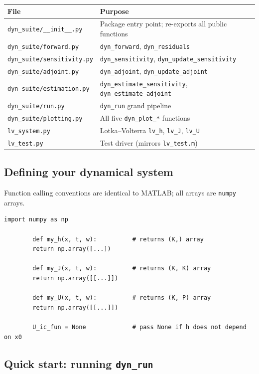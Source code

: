 \documentclass[10pt]{article}
\begin{document}
	\medskip
	\noindent
	\begin{tabular}{@{}L{4.3cm}L{9cm}@{}}
		\toprule
		File & Purpose \\
		\midrule
		\texttt{dyn\_suite/\_\_init\_\_.py} & Package entry point; re-exports all public functions \\
		\texttt{dyn\_suite/forward.py}      & \texttt{dyn\_forward}, \texttt{dyn\_residuals} \\
		\texttt{dyn\_suite/sensitivity.py}  & \texttt{dyn\_sensitivity}, \texttt{dyn\_update\_sensitivity} \\
		\texttt{dyn\_suite/adjoint.py}      & \texttt{dyn\_adjoint}, \texttt{dyn\_update\_adjoint} \\
		\texttt{dyn\_suite/estimation.py}   & \texttt{dyn\_estimate\_sensitivity}, \texttt{dyn\_estimate\_adjoint} \\
		\texttt{dyn\_suite/run.py}          & \texttt{dyn\_run} grand pipeline \\
		\texttt{dyn\_suite/plotting.py}     & All five \texttt{dyn\_plot\_*} functions \\
		\texttt{lv\_system.py}              & Lotka--Volterra \texttt{lv\_h}, \texttt{lv\_J}, \texttt{lv\_U} \\
		\texttt{lv\_test.py}                & Test driver (mirrors \texttt{lv\_test.m}) \\
		\bottomrule
	\end{tabular}
	
	\subsection{Defining your dynamical system}
	
	Function calling conventions are identical to MATLAB;
	all arrays are \texttt{numpy} arrays.
	
	\begin{lstlisting}[style=python]
		import numpy as np
		
		def my_h(x, t, w):          # returns (K,) array
		return np.array([...])
		
		def my_J(x, t, w):          # returns (K, K) array
		return np.array([[...]])
		
		def my_U(x, t, w):          # returns (K, P) array
		return np.array([[...]])
		
		U_ic_fun = None             # pass None if h does not depend on x0
	\end{lstlisting}
	
	\subsection{Quick start: running \texttt{dyn\_run}}
	
\end{document}
